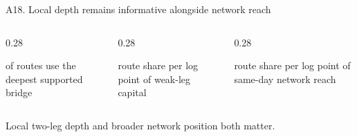 \begin{frame}{A18. Local depth remains informative alongside network reach}
\vspace{0.18cm}
\begin{columns}[T,totalwidth=0.92\textwidth]
\begin{column}{0.28\textwidth}
{\fontsize{24}{26}\selectfont\bfseries\color{ucldark}\BridgeLiquidityTopShare}\par
{\small of routes use the deepest supported bridge\par}
\end{column}
\hfill
\begin{column}{0.28\textwidth}
{\fontsize{24}{26}\selectfont\bfseries\color{stable}\BridgeLiquidityHorseRaceDepthCoef}\par
{\small route share per log point of weak-leg capital\par}
\end{column}
\hfill
\begin{column}{0.28\textwidth}
{\fontsize{24}{26}\selectfont\bfseries\color{uclbright}\BridgeLiquidityHorseRaceGlobalDayCoef}\par
{\small route share per log point of same-day network reach\par}
\end{column}
\end{columns}
\vspace{0.68cm}
{\large Local two-leg depth and broader network position both matter.\par}
\end{frame}

